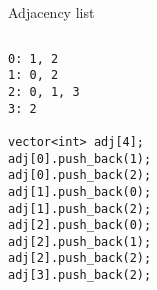 \documentclass[12pt,t]{beamer}
\begin{document}
\begin{frame}[fragile]{Adjacency list}

    \begin{columns}[T]
        \begin{column}{.4\textwidth}
            \begin{verbatim}
0: 1, 2
1: 0, 2
2: 0, 1, 3
3: 2

vector<int> adj[4];
adj[0].push_back(1);
adj[0].push_back(2);
adj[1].push_back(0);
adj[1].push_back(2);
adj[2].push_back(0);
adj[2].push_back(1);
adj[2].push_back(2);
adj[3].push_back(2);
            \end{verbatim}
        \end{column}%
        \hfill%
        \begin{column}{.4\textwidth}
            \begin{figure}
            \end{figure}
        \end{column}%
    \end{columns}
\end{frame}
\end{document}

